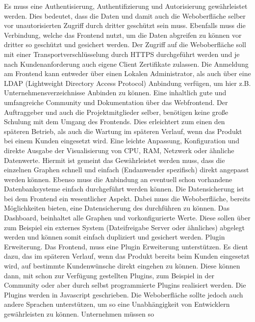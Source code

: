 \begin{outline}
  \1 Es muss eine Authentisierung, Authentifizierung und Autorisierung
  gewährleistet werden. Dies bedeutet, dass die Daten und damit auch die
  Weboberfläche selber vor unautorisierten Zugriff durch dritter geschützt sein
  muss. Ebenfalls muss die Verbindung, welche das Frontend nutzt, um die Daten
  abgreifen zu können vor dritter so geschützt und gesichert werden. Der
  Zugriff auf die Weboberfläche soll mit einer Transportverschlüsselung durch
  \gls{HTTPS} durchgeführt werden und je nach Kundenanforderung auch eigene
  Client Zertifikate zulassen. Die Anmeldung am Frontend kann entweder über
  einen Lokalen Administrator, als auch über eine LDAP (Lightweight Directory
  Access Protocol) Anbindung verfügen, um hier z.B. Unternehmensverzeichnisse
  Anbinden zu können.
  \1 Eine inhaltlich gute und umfangreiche Community und Dokumentation über das
  Webfrontend. Der Auftraggeber und auch die Projektmitglieder selber,
  benötigen keine große Schulung mit dem Umgang des Frontends. Dies erleichtert
  zum einen den späteren Betrieb, als auch die Wartung im späteren Verlauf,
  wenn das Produkt bei einem Kunden eingesetzt wird.
  \1 Eine leichte Anpassung, Konfiguration und direkte Ausgabe der
  Visualisierung von CPU, RAM, Netzwerk oder ähnliche Datenwerte. Hiermit ist
  gemeint das Gewährleistet werden muss, dass die einzelnen Graphen schnell
  und einfach (Endanwender spezifisch) direkt angepasst werden können. Ebenso
  muss die Anbindung an eventuell schon vorhandene Datenbanksysteme einfach
  durchgeführt werden können.
  \1 Die Datensicherung ist bei dem Frontend ein wesentlicher Aspekt. Dabei
  muss die Weboberfläche, bereits Möglichkeiten bieten, eine Datensicherung des
   durchführen zu können. Das Dashboard,
  beinhaltet alle Graphen und vorkonfigurierte Werte. Diese sollen über zum
  Beispiel ein externes System (Dateifreigabe Server oder ähnliches) abgelegt
  werden und können somit einfach dupliziert und gesichert werden.
  \1 Plugin Erweiterung. Das Frontend, muss eine Plugin Erweiterung
  unterstützen. Es dient dazu, das im späteren Verlauf, wenn das Produkt
  bereits beim Kunden eingesetzt wird, auf bestimmte Kundenwünsche direkt
  eingehen zu können. Diese können dann, mit schon zur Verfügung gestellten
  Plugins, zum Beispiel in der Community oder aber durch selbst programmierte
  Plugins realisiert werden. Die Plugins werden in Javascript geschrieben. Die
  Weboberfläche sollte jedoch auch andere Sprachen unterstützen, um so eine
  Unabhängigkeit von Entwicklern gewährleisten zu können. Unternehmen müssen so

\end{outline}
